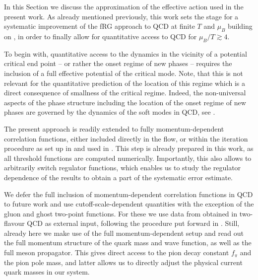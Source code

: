 \documentclass[aps,twocolumn,prd,superscriptaddress]{revtex4-2}
\begin{document}
In this Section we discuss the approximation of the effective action used in the present work. As already mentioned previously, this work sets the stage for a systematic improvement of the fRG approach to QCD at finite $T$ and $\mu_B$ building on \cite{Braun:2014ata, Mitter:2014wpa, Rennecke:2015eba, Cyrol:2017ewj, Cyrol:2017qkl, Fu:2019hdw}, in order to finally allow for quantitative access to QCD for $\mu_B/T\gtrsim 4$.

To begin with, quantitative access to the dynamics in the vicinity of a potential critical end point -- or rather the onset regime of new phases -- requires the inclusion of a full effective potential of the critical mode. Note, that this is not relevant for the quantitative prediction of the location of this regime which is a direct consequence of smallness of the critical regime. Indeed, the non-universal aspects of the phase structure including the location of the onset regime of new phases are governed by the dynamics of the soft modes in QCD, see \cite{Braun:2023qak}.

The present approach is readily extended to fully momentum-dependent correlation functions, either included directly in the flow, or within the iteration procedure as set up in \cite{Helmboldt:2014iya} and used in \cite{IKPS2023}.
This step is already prepared in this work, as all threshold functions are computed numerically. Importantly, this also allows to arbitrarily switch regulator functions, which enables us to study the regulator dependence of the results to obtain a part of the systematic error estimate.

We defer the full inclusion of momentum-dependent correlation functions in QCD to future work and use cutoff-scale-dependent quantities with the exception of the gluon and ghost two-point functions. For these we use data from \cite{Cyrol:2017ewj} obtained in two-flavour QCD as external input, following the procedure put forward in \cite{Braun:2014ata}. Still, already here we make use of the full momentum-dependent setup and read out the full momentum structure of the quark mass and wave function, as well as the full meson propagator. This gives direct access to the pion decay constant $f_\pi$ and the pion pole mass, and latter allows us to directly adjust the physical current quark masses in our system. 
\end{document}
